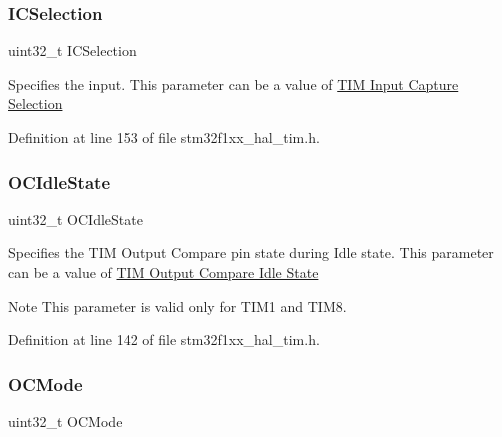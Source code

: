 \subsubsection{\texorpdfstring{I\+C\+Selection}{ICSelection}}
{\footnotesize\ttfamily uint32\+\_\+t I\+C\+Selection}

Specifies the input. This parameter can be a value of \hyperlink{group___t_i_m___input___capture___selection}{T\+IM Input Capture Selection} 

Definition at line 153 of file stm32f1xx\+\_\+hal\+\_\+tim.\+h.

\mbox{\label{struct_t_i_m___one_pulse___init_type_def_a57bb589da3cf2b39b727fe4a3d334ab3}} 
\subsubsection{\texorpdfstring{O\+C\+Idle\+State}{OCIdleState}}
{\footnotesize\ttfamily uint32\+\_\+t O\+C\+Idle\+State}

Specifies the T\+IM Output Compare pin state during Idle state. This parameter can be a value of \hyperlink{group___t_i_m___output___compare___idle___state}{T\+IM Output Compare Idle State} \begin{DoxyNote}{Note}
This parameter is valid only for T\+I\+M1 and T\+I\+M8. 
\end{DoxyNote}


Definition at line 142 of file stm32f1xx\+\_\+hal\+\_\+tim.\+h.

\mbox{\label{struct_t_i_m___one_pulse___init_type_def_add4ac9143086c89effbede5c54e958bf}} 
\subsubsection{\texorpdfstring{O\+C\+Mode}{OCMode}}
{\footnotesize\ttfamily uint32\+\_\+t O\+C\+Mode}

